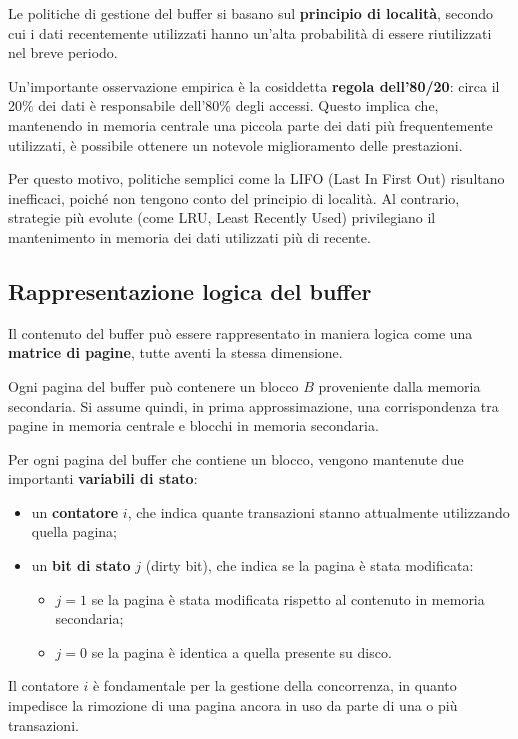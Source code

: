 Le politiche di gestione del buffer si basano sul \textbf{principio di località}, secondo cui i dati recentemente utilizzati hanno un'alta probabilità di essere riutilizzati nel breve periodo.

Un'importante osservazione empirica è la cosiddetta \textbf{regola dell'80/20}: circa il 20\% dei dati è responsabile dell'80\% degli accessi. 
Questo implica che, mantenendo in memoria centrale una piccola parte dei dati più frequentemente utilizzati, è possibile ottenere un notevole miglioramento delle prestazioni.

Per questo motivo, politiche semplici come la LIFO (Last In First Out) risultano inefficaci, poiché non tengono conto del principio di località. 
Al contrario, strategie più evolute (come LRU, Least Recently Used) privilegiano il mantenimento in memoria dei dati utilizzati più di recente.
\subsection{Rappresentazione logica del buffer}

Il contenuto del buffer può essere rappresentato in maniera logica come una \textbf{matrice di pagine}, tutte aventi la stessa dimensione.

Ogni pagina del buffer può contenere un blocco $B$ proveniente dalla memoria secondaria. 
Si assume quindi, in prima approssimazione, una corrispondenza tra pagine in memoria centrale e blocchi in memoria secondaria.

Per ogni pagina del buffer che contiene un blocco, vengono mantenute due importanti \textbf{variabili di stato}:

\begin{itemize}
	\item un \textbf{contatore} $i$, che indica quante transazioni stanno attualmente utilizzando quella pagina;
	
	\item un \textbf{bit di stato} $j$ (dirty bit), che indica se la pagina è stata modificata:
	\begin{itemize}
		\item $j = 1$ se la pagina è stata modificata rispetto al contenuto in memoria secondaria;
		\item $j = 0$ se la pagina è identica a quella presente su disco.
	\end{itemize}
\end{itemize}

Il contatore $i$ è fondamentale per la gestione della concorrenza, in quanto impedisce la rimozione di una pagina ancora in uso da parte di una o più transazioni.

